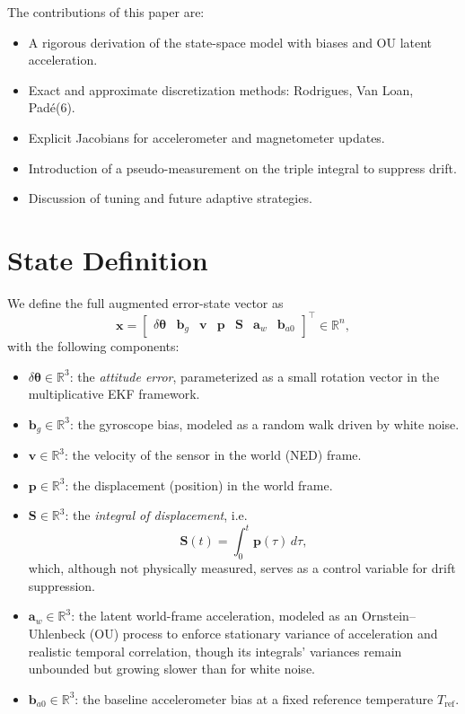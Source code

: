 \documentclass[10pt]{extarticle}
\begin{document}
The contributions of this paper are:
\begin{itemize}
\item A rigorous derivation of the state-space model with biases and OU latent acceleration.
\item Exact and approximate discretization methods: Rodrigues, Van Loan, Pad\'e(6).
\item Explicit Jacobians for accelerometer and magnetometer updates.
\item Introduction of a pseudo-measurement on the triple integral to suppress drift.
\item Discussion of tuning and future adaptive strategies.
\end{itemize}

\section{State Definition}

We define the full augmented error-state vector as
\begin{equation}
\bm{x} =
\begin{bmatrix}
\delta\bm\theta & \bm b_g & \bm v & \bm p & \bm S & \bm a_w & \bm b_{a0}
\end{bmatrix}^\top \in \mathbb{R}^n,
\label{eq:state_vector}
\end{equation}
with the following components:
\begin{itemize}
\item $\delta\bm\theta \in \mathbb{R}^3$: the \emph{attitude error}, parameterized as a small rotation vector in the multiplicative EKF framework.
\item $\bm b_g \in \mathbb{R}^3$: the gyroscope bias, modeled as a random walk driven by white noise.
\item $\bm v \in \mathbb{R}^3$: the velocity of the sensor in the world (NED) frame.
\item $\bm p \in \mathbb{R}^3$: the displacement (position) in the world frame.
\item $\bm S \in \mathbb{R}^3$: the \emph{integral of displacement}, i.e.
  \[
  \bm S(t) = \int_0^t \bm p(\tau)\, d\tau,
  \]
  which, although not physically measured, serves as a control variable for drift suppression.
\item $\bm a_w \in \mathbb{R}^3$: the latent world-frame acceleration, modeled as an Ornstein--Uhlenbeck (OU) process to enforce stationary variance of acceleration and realistic temporal correlation, though its integrals' variances remain unbounded but growing slower than for white noise.
\item $\bm b_{a0} \in \mathbb{R}^3$: the baseline accelerometer bias at a fixed reference temperature $T_\text{ref}$.
\end{itemize}
\end{document}
